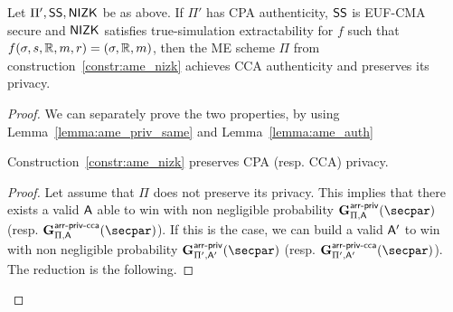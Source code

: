 \begin{theorem}\label{theo:ame_nizk_auth}
    Let $\Pi', \mathsf{SS}, \mathsf{NIZK}$ be as above.
    If $\Pi'$ has CPA authenticity, $\mathsf{SS}$ is EUF-CMA secure and $\mathsf{NIZK}$ satisfies true-simulation extractability for $f$ such that $f(\sigma, s, \mathbb{R}, m, r) = (\sigma, \mathbb{R}, m)$, then the ME scheme $\Pi$ from construction~\ref{constr:ame_nizk} achieves CCA authenticity and preserves its privacy.
\end{theorem}

\begin{proof}
    We can separately prove the two properties, by using Lemma~\ref{lemma:ame_priv_same} and Lemma~\ref{lemma:ame_auth}

    \begin{lemma}\label{lemma:ame_priv_same}
        Construction~\ref{constr:ame_nizk} preserves CPA (resp. CCA) privacy.
        \begin{proof}
            Let assume that $\Pi$ does not preserve its privacy.
            This implies that there exists a valid $\mathsf{A}$ able to win with non negligible probability $\NISHmatchgame{\arranged}_{\Pi, \adversary}(\secpar)$ (resp. $\NISHmatchgamecca{\arranged}_{\Pi, \adversary}(\secpar)$).
            If this is the case, we can build a valid $\mathsf{A}'$ to win with non negligible probability $\NISHmatchgame{\arranged}_{\Pi', \adversary'}(\secpar)$ (resp. $\NISHmatchgamecca{\arranged}_{\Pi', \adversary'}(\secpar)$).
            The reduction is the following.


\end{proof}
\end{lemma}
\end{proof}
